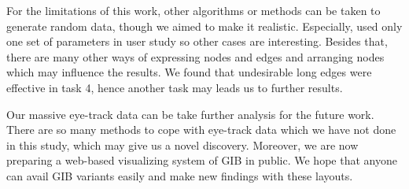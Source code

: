 \documentclass{llncs}
\begin{document}
For the limitations of this work, other algorithms or methods can be taken to generate random data, though we aimed to make it realistic.
Especially, used only one set of parameters in user study so other cases are interesting.
Besides that, there are many other ways of expressing nodes and edges and arranging nodes which may influence the results.
We found that undesirable long edges were effective in task 4, hence another task may leads us to further results.

Our massive eye-track data can be take further analysis for the future work.
There are so many methods to cope with eye-track data which we have not done in this study, which may give us a novel discovery.
Moreover, we are now preparing a web-based visualizing system of GIB in public.
We hope that anyone can avail GIB variants easily and make new findings with these layouts.

\newpage
\end{document}
